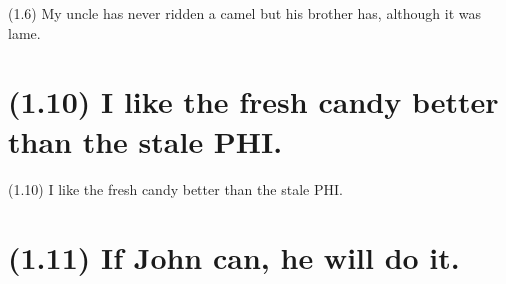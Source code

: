 \documentclass{article}
\begin{document}
\bigbreak
\begin{enumerate*}
\item[(1.6)] My uncle has never ridden a camel but his brother has, although it was lame.
\end{enumerate*}
\bigbreak

\bigbreak
\begin{minipage}{\textwidth}
\end{minipage}
\bigbreak

\clearpage

%
%

\section*{(1.10) I like the fresh candy better than the stale PHI.}

\bigbreak
\begin{enumerate*}
\item[(1.10)] I like the fresh candy better than the stale PHI.
\end{enumerate*}
\bigbreak

\bigbreak
\begin{minipage}{\textwidth}
\end{minipage}
\bigbreak

\clearpage

%
%

\section*{(1.11) If John can, he will do it.}
\end{document}
